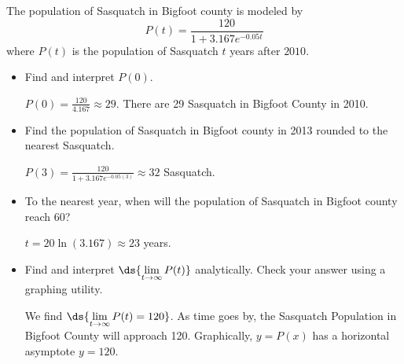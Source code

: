 \documentclass{ximera}
\begin{document}
\begin{problem}
The population of Sasquatch in Bigfoot county is modeled by \[P(t) = \dfrac{120}{1 + 3.167e^{-0.05t}}\] where $P(t)$ is the population of Sasquatch $t$ years after $2010$.

\begin{itemize}
    \item 
    Find and interpret $P(0)$.

\begin{solution}
    $P(0) = \frac{120}{4.167} \approx 29$.  There are 29 Sasquatch in Bigfoot County in 2010.
\end{solution}
    
\item
    Find the population of Sasquatch in Bigfoot county in 2013 rounded to the nearest Sasquatch.

\begin{solution}
     $P(3) = \frac{120}{1+3.167e^{-0.05(3)}} \approx 32$ Sasquatch.
\end{solution}
    
\item 
    To the nearest year, when will the population of Sasquatch in Bigfoot county reach 60?  

\begin{solution}
    $t = 20 \ln(3.167) \approx 23$ years.
\end{solution}
    
\item 
    Find and interpret  $\ds{\lim_{t \rightarrow \infty} P(t)}$ analytically. Check your answer using a graphing utility. 

\begin{solution}
    We find $\ds{\lim_{t \rightarrow \infty} P(t) =  120}$.  As time goes by, the Sasquatch Population in Bigfoot County will approach 120.  Graphically,  $y = P(x)$ has a horizontal asymptote $y=120$.
\end{solution}
    
\end{itemize}

\end{problem}
\end{document}
